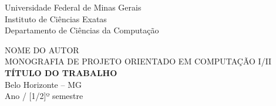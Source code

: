 \begin{titlepage}
\begin{center}
Universidade Federal de Minas Gerais \\
Instituto de Ciências Exatas \\
Departamento de Ciências da Computação \\
\end{center}
\vspace{5em}
\begin{center}
{NOME DO AUTOR}\\ 
\vspace{10em}
{MONOGRAFIA DE PROJETO ORIENTADO EM COMPUTAÇÃO I/II} \\
\vspace{1em}
\textbf{TÍTULO DO TRABALHO} \\
\hspace{.45\textwidth} %
\vfill
Belo Horizonte -- MG \\
Ano / [1/2]º semestre
\end{center}
\end{titlepage}
